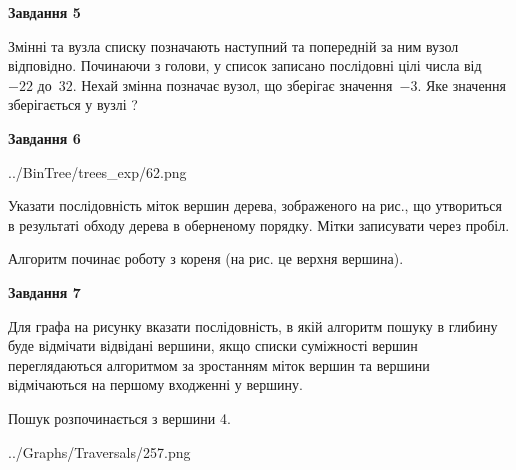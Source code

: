 \documentclass[12pt, ukrainian]{article}
\begin{document}
{\begin {large}
{\begin {center}\textbf{Завдання 5}\end {center}}\par
Змінні  та  вузла списку позначають наступний та попередній за ним вузол відповідно. Починаючи з голови, у список записано послідовні цілі числа від~$-22$ до~$32$. Нехай змінна  позначає вузол, що зберігає значення~$-3$.
Яке значення зберігається у вузлі  ?\par
\newpage

{\begin {center}\textbf{Завдання 6}\end {center}}\par

\begin{center}
	{../BinTree/trees_exp/62.png}
\end{center}
Указати послідовність міток вершин дерева, зображеного на рис., що утвориться в результаті обходу дерева в оберненому порядку. Мітки записувати через пробіл.\par Алгоритм починає роботу з кореня (на рис. це верхня вершина).\par
\newpage

{\begin {center}\textbf{Завдання 7}\end {center}}\par
Для графа на рисунку вказати послідовність, в якій алгоритм пошуку в глибину буде відмічати відвідані вершини, якщо списки суміжності вершин переглядаються алгоритмом за зростанням міток вершин та вершини відмічаються на першому вход\-женні у вершину.\par
Пошук розпочинається з вершини 4.\par

\begin{center}
	{../Graphs/Traversals/257.png}
\end{center}\par
\newpage


\end{large}}
\end{document}
